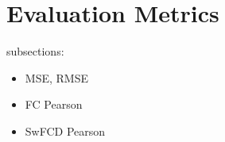 \section{Evaluation Metrics}

subsections:
\begin{itemize}
    \item MSE, RMSE
    \item FC Pearson
    \item SwFCD Pearson
\end{itemize}